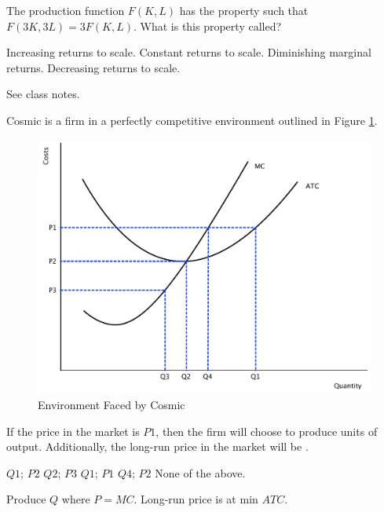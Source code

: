 \documentclass[addpoints,11pt]{exam}
\theoremstyle{definition}
\newcommand{\blank}[0]{\underline{\hspace{3cm}}}
\begin{document}
\begin{questions}
\question The production function $F(K,L)$ has the property such that $F(3K,3L) = 3F(K,L)$. What is this property called?

\begin{choices}
\choice Increasing returns to scale.
\CorrectChoice Constant returns to scale.
\choice Diminishing marginal returns.
\choice Decreasing returns to scale.	
\end{choices}

\begin{solution}
See class notes.
\end{solution}

\question Cosmic is a firm in a perfectly competitive environment outlined in Figure \ref{fig3}.

	\begin{figure}[h!]
		\centering
		\includegraphics[scale=.40]{final_17.pdf}
		\caption{Environment Faced by Cosmic}
		\label{fig3}
	\end{figure}
	
If the price in the market is $P1$, then the firm will choose to produce \blank units of output. Additionally, the long-run price in the market will be \blank.
	
\begin{choices}
\choice $Q1$; $P2$
\choice $Q2$; $P3$
\choice $Q1$; $P1$
\CorrectChoice $Q4$; $P2$
\choice None of the above.
\end{choices}

\begin{solution}
Produce $Q$ where $P = MC$. Long-run price is at min $ATC$.
\end{solution}


\end{questions}
\end{document}
